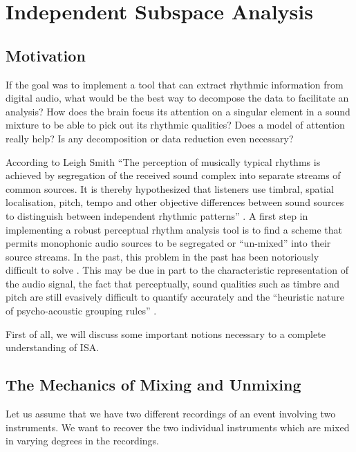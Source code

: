 \vspace{7mm}
\section{Independent Subspace Analysis}
\vspace{3mm}

\subsection{Motivation}

If the goal was to implement a tool that can extract rhythmic 
information from digital audio, what would be the best way to decompose 
the data to facilitate an analysis? How does the brain focus its
attention on a singular element in a sound mixture to be able to pick
out its rhythmic qualities? Does a model of attention really help? 
Is any decomposition or data  reduction even necessary? 

According to Leigh Smith ``The perception  of musically typical rhythms is achieved by 
segregation of the received sound complex into separate streams of 
common sources. It is thereby hypothesized that listeners use timbral, spatial 
localisation, pitch, tempo and other objective differences between 
sound sources to distinguish between independent rhythmic patterns'' \cite[p .85]{Smith:99}.
A first step in implementing a robust perceptual rhythm analysis 
tool is to find a scheme that permits monophonic audio sources to be 
segregated or ``un-mixed'' into their source streams.  In the past, this
problem in the past has been notoriously difficult to solve \cite{Bilmes:93}.
This may be due in part to the characteristic representation of the 
audio signal, the fact that perceptually, sound qualities such 
as timbre and pitch are still evasively difficult to quantify 
accurately and the ``heuristic nature of psycho-acoustic 
grouping rules'' \cite{Casey:2000}.  

First of all, we will discuss some important notions necessary 
to a complete understanding of ISA.

\subsection{The Mechanics of Mixing and Unmixing}

Let us assume that we have two different recordings of an event
involving two instruments. We want to recover the two individual 
instruments which are mixed in varying degrees in the recordings. 

